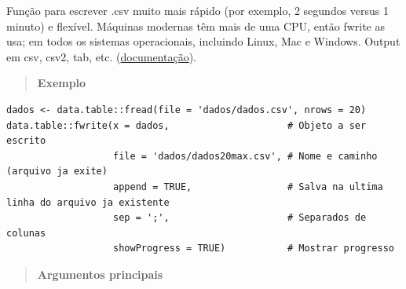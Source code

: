 \documentclass[
]{book}
\theoremstyle{definition}
\theoremstyle{definition}
\theoremstyle{definition}
\theoremstyle{definition}
\theoremstyle{remark}
\begin{document}
Função para escrever .csv muito mais rápido (por exemplo, 2 segundos versus 1 minuto) e flexível. Máquinas modernas têm mais de uma CPU, então fwrite as usa; em todos os sistemas operacionais, incluindo Linux, Mac e Windows. Output em csv, csv2, tab, etc. (\href{https://www.rdocumentation.org/packages/data.table/versions/1.14.2/topics/fwrite}{documentação}).

\begin{quote}
\textbf{Exemplo}
\end{quote}

\begin{verbatim}
dados <- data.table::fread(file = 'dados/dados.csv', nrows = 20)
data.table::fwrite(x = dados,                     # Objeto a ser escrito
                   file = 'dados/dados20max.csv', # Nome e caminho (arquivo ja exite)
                   append = TRUE,                 # Salva na ultima linha do arquivo ja existente
                   sep = ';',                     # Separados de colunas
                   showProgress = TRUE)           # Mostrar progresso
\end{verbatim}

\begin{quote}
\textbf{Argumentos principais}
\end{quote}
\end{document}
